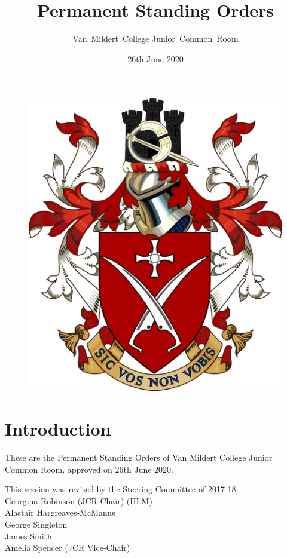 \documentclass[12pt]{article}
\title{Permanent Standing Orders}
\author{Van~Mildert~College Junior~Common~Room}
\date{26th June 2020}
\begin{document}
\begin{titlepage}  %
    \maketitle
    \begin{figure}[h]
    \includegraphics[scale=0.25]{arms}  %
    \centering
    \end{figure}
    \thispagestyle{empty}
\end{titlepage}

\setcounter{page}{2}  %
\section*{Introduction}
These are the Permanent Standing Orders of Van Mildert College Junior Common Room, approved on 26th June 2020.

This version was revised by the Steering Committee of 2017-18:\\
\hspace*{2cm}Georgina Robinson (JCR Chair) (HLM)\\
\hspace*{2cm}Alastair Hargreaves-McManus\\
\hspace*{2cm}George Singleton\\
\hspace*{2cm}James Smith\\
\hspace*{2cm}Amelia Spencer (JCR Vice-Chair)
\end{document}
